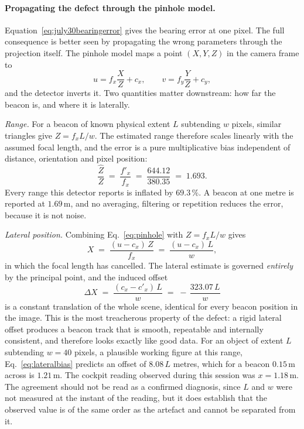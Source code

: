 \paragraph{Propagating the defect through the pinhole model.}
Equation~\ref{eq:july30bearingerror} gives the bearing error at one pixel. The
full consequence is better seen by propagating the wrong parameters through
the projection itself. The pinhole model maps a point
$(X,Y,Z)$ in the camera frame to
\begin{equation}
u = f_x\frac{X}{Z} + c_x, \qquad v = f_y\frac{Y}{Z} + c_y,
\label{eq:pinhole}
\end{equation}
and the detector inverts it. Two quantities matter downstream: how far the
beacon is, and where it is laterally.

\smallskip\noindent\textit{Range.} For a beacon of known physical extent $L$
subtending $w$ pixels, similar triangles give $Z = f_x L / w$. The estimated
range therefore scales linearly with the assumed focal length, and the error
is a pure multiplicative bias independent of distance, orientation and pixel
position:
\begin{equation}
\frac{\hat Z}{Z} \;=\; \frac{f'_x}{f_x} \;=\; \frac{644.12}{380.35}
  \;=\; 1.693 .
\label{eq:rangebias}
\end{equation}
Every range this detector reports is inflated by $69.3\,\%$. A beacon at one
metre is reported at $1.69$\,m, and no averaging, filtering or repetition
reduces the error, because it is not noise.

\smallskip\noindent\textit{Lateral position.} Combining
Eq.~\ref{eq:pinhole} with $Z = f_x L/w$ gives
\begin{equation}
X \;=\; \frac{(u - c_x)\,Z}{f_x} \;=\; \frac{(u-c_x)\,L}{w},
\label{eq:lateral}
\end{equation}
in which the focal length has cancelled. The lateral estimate is governed
\emph{entirely} by the principal point, and the induced offset
\begin{equation}
\Delta X \;=\; \frac{(c_x - c'_x)\,L}{w}
      \;=\; -\,\frac{323.07\,L}{w}
\label{eq:lateralbias}
\end{equation}
is a constant translation of the whole scene, identical for every beacon
position in the image. This is the most treacherous property of the defect:
a rigid lateral offset produces a beacon track that is smooth, repeatable and
internally consistent, and therefore looks exactly like good data. For an
object of extent $L$ subtending $w = 40$ pixels, a plausible working figure at
this range, Eq.~\ref{eq:lateralbias} predicts an offset of $8.08\,L$ metres,
which for a beacon $0.15$\,m across is $1.21$\,m. The cockpit reading observed
during this session was $x = 1.18$\,m. The agreement should not be read as a
confirmed diagnosis, since $L$ and $w$ were not measured at the instant of the
reading, but it does establish that the observed value is of the same order as
the artefact and cannot be separated from it.

